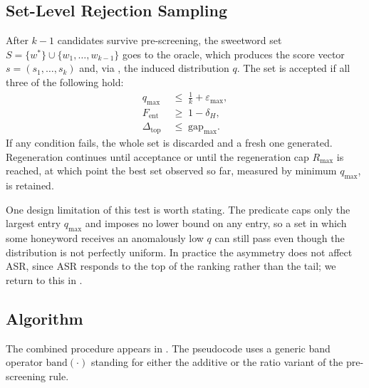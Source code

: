 \subsection{Set-Level Rejection Sampling}

After $k-1$ candidates survive pre-screening, the sweetword set
$S = \{w^{*}\} \cup \{w_1, \ldots, w_{k-1}\}$ goes to the oracle, which
produces the score vector $s = (s_1, \ldots, s_k)$ and, via
, the induced distribution $q$. The set is accepted if all
three of the following hold:
%
\begin{align}
q_{\max} &\;\le\; \frac{1}{k} + \varepsilon_{\max}, \\
F_{\text{ent}}  &\;\ge\; 1 - \delta_{H}, \\
\Delta_{\text{top}} &\;\le\; \text{gap}_{\max}.
\end{align}
%
If any condition fails, the whole set is discarded and a fresh one
generated. Regeneration continues until acceptance or until the
regeneration cap $R_{\max}$ is reached, at which point the best set
observed so far, measured by minimum $q_{\max}$, is retained.

One design limitation of this test is worth stating. The predicate caps
only the largest entry $q_{\max}$ and imposes no lower bound on any
entry, so a set in which some honeyword receives an anomalously low $q$
can still pass even though the distribution is not perfectly uniform. In
practice the asymmetry does not affect ASR, since ASR responds to the
top of the ranking rather than the tail; we return to this in
.

\subsection{Algorithm}

The combined procedure appears in . The pseudocode uses a
generic band operator $\text{band}(\cdot)$ standing for either the
additive or the ratio variant of the pre-screening rule.

